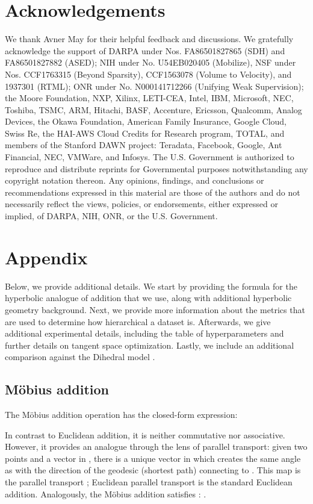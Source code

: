 \documentclass[11pt,a4paper]{article}
\begin{document}
\section*{Acknowledgements}
We thank Avner May for their helpful feedback and discussions. We gratefully acknowledge the support of DARPA under Nos. FA86501827865 (SDH) and FA86501827882 (ASED); NIH under No. U54EB020405 (Mobilize), NSF under Nos. CCF1763315 (Beyond Sparsity), CCF1563078 (Volume to Velocity), and 1937301 (RTML); ONR under No. N000141712266 (Unifying Weak Supervision); the Moore Foundation, NXP, Xilinx, LETI-CEA, Intel, IBM, Microsoft, NEC, Toshiba, TSMC, ARM, Hitachi, BASF, Accenture, Ericsson, Qualcomm, Analog Devices, the Okawa Foundation, American Family Insurance, Google Cloud, Swiss Re, the HAI-AWS Cloud Credits for Research program, TOTAL, and members of the Stanford DAWN project: Teradata, Facebook, Google, Ant Financial, NEC, VMWare, and Infosys. The U.S. Government is authorized to reproduce and distribute reprints for Governmental purposes notwithstanding any copyright notation thereon. Any opinions, findings, and conclusions or recommendations expressed in this material are those of the authors and do not necessarily reflect the views, policies, or endorsements, either expressed or implied, of DARPA, NIH, ONR, or the U.S. Government. 



\clearpage
\appendix
\section{Appendix}
Below, we provide additional details. 
We start by providing the formula for the hyperbolic analogue of addition that we use, along with additional hyperbolic geometry background. 
Next, we provide more information about the metrics that are used to determine how hierarchical a dataset is.
Afterwards, we give additional experimental details, including the table of hyperparameters and further details on tangent space optimization. 
Lastly, we include an additional comparison against the Dihedral model \cite{xu2019relation}.

\subsection{M\"obius addition}\label{sec:appendix_hyp}
The M\"obius addition operation \cite{ganea2018hyperbolicNN} has the closed-form expression:

In contrast to Euclidean addition, it is neither commutative nor associative. 
However, it provides an analogue through the lens of parallel transport: 
given two points  and a vector  in , there is a unique vector in  which creates the same angle as  with the direction of the geodesic (shortest path) connecting  to . 
This map is the parallel transport ; Euclidean parallel transport is the standard Euclidean addition. 
Analogously, the M\"obius addition satisfies \cite{ganea2018hyperbolicNN}:
. 
 
\end{document}
